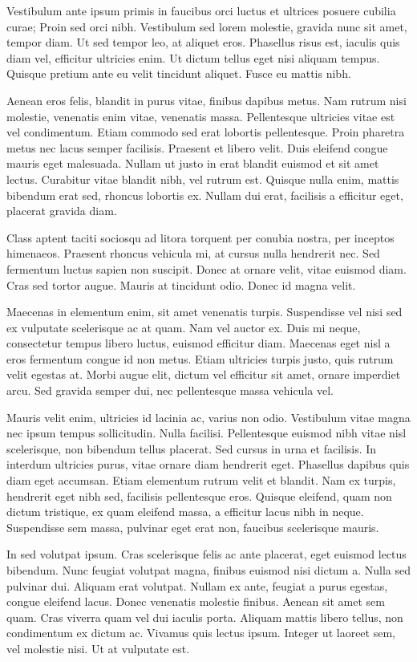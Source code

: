 \documentclass[
]{book}
\begin{document}
Vestibulum ante ipsum primis in faucibus orci luctus et ultrices posuere cubilia curae; Proin sed orci nibh. Vestibulum sed lorem molestie, gravida nunc sit amet, tempor diam. Ut sed tempor leo, at aliquet eros. Phasellus risus est, iaculis quis diam vel, efficitur ultricies enim. Ut dictum tellus eget nisi aliquam tempus. Quisque pretium ante eu velit tincidunt aliquet. Fusce eu mattis nibh.

Aenean eros felis, blandit in purus vitae, finibus dapibus metus. Nam rutrum nisi molestie, venenatis enim vitae, venenatis massa. Pellentesque ultricies vitae est vel condimentum. Etiam commodo sed erat lobortis pellentesque. Proin pharetra metus nec lacus semper facilisis. Praesent et libero velit. Duis eleifend congue mauris eget malesuada. Nullam ut justo in erat blandit euismod et sit amet lectus. Curabitur vitae blandit nibh, vel rutrum est. Quisque nulla enim, mattis bibendum erat sed, rhoncus lobortis ex. Nullam dui erat, facilisis a efficitur eget, placerat gravida diam.

Class aptent taciti sociosqu ad litora torquent per conubia nostra, per inceptos himenaeos. Praesent rhoncus vehicula mi, at cursus nulla hendrerit nec. Sed fermentum luctus sapien non suscipit. Donec at ornare velit, vitae euismod diam. Cras sed tortor augue. Mauris at tincidunt odio. Donec id magna velit.

Maecenas in elementum enim, sit amet venenatis turpis. Suspendisse vel nisi sed ex vulputate scelerisque ac at quam. Nam vel auctor ex. Duis mi neque, consectetur tempus libero luctus, euismod efficitur diam. Maecenas eget nisl a eros fermentum congue id non metus. Etiam ultricies turpis justo, quis rutrum velit egestas at. Morbi augue elit, dictum vel efficitur sit amet, ornare imperdiet arcu. Sed gravida semper dui, nec pellentesque massa vehicula vel.

Mauris velit enim, ultricies id lacinia ac, varius non odio. Vestibulum vitae magna nec ipsum tempus sollicitudin. Nulla facilisi. Pellentesque euismod nibh vitae nisl scelerisque, non bibendum tellus placerat. Sed cursus in urna et facilisis. In interdum ultricies purus, vitae ornare diam hendrerit eget. Phasellus dapibus quis diam eget accumsan. Etiam elementum rutrum velit et blandit. Nam ex turpis, hendrerit eget nibh sed, facilisis pellentesque eros. Quisque eleifend, quam non dictum tristique, ex quam eleifend massa, a efficitur lacus nibh in neque. Suspendisse sem massa, pulvinar eget erat non, faucibus scelerisque mauris.

In sed volutpat ipsum. Cras scelerisque felis ac ante placerat, eget euismod lectus bibendum. Nunc feugiat volutpat magna, finibus euismod nisi dictum a. Nulla sed pulvinar dui. Aliquam erat volutpat. Nullam ex ante, feugiat a purus egestas, congue eleifend lacus. Donec venenatis molestie finibus. Aenean sit amet sem quam. Cras viverra quam vel dui iaculis porta. Aliquam mattis libero tellus, non condimentum ex dictum ac. Vivamus quis lectus ipsum. Integer ut laoreet sem, vel molestie nisi. Ut at vulputate est.
\end{document}
